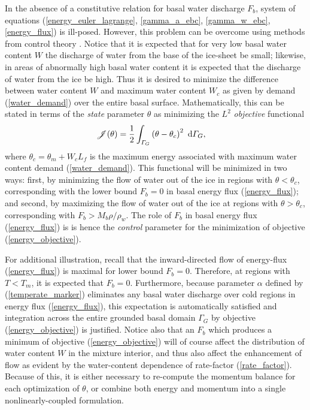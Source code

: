 In the absence of a constitutive relation for basal water discharge $F_b$, system of equations (\ref{energy_euler_lagrange}, \ref{gamma_a_ebc}, \ref{gamma_w_ebc}, \ref{energy_flux}) is ill-posed.  However, this problem can be overcome using methods from control theory \citep{bryson_1975, macayeal_1993, nocedal_2000}.  Notice that it is expected that for very low basal water content $W$ the discharge of water from the base of the ice-sheet be small; likewise, in areas of abnormally high basal water content it is expected that the discharge of water from the ice be high.  Thus it is desired to minimize the difference between water content $W$ and maximum water content $W_c$ as given by demand (\ref{water_demand}) over the entire basal surface.  Mathematically, this can be stated in terms of the  \emph{state} parameter $\theta$ as minimizing the  $L^2$ \emph{objective} functional
\begin{align}
  \label{energy_objective}
  \mathscr{J}(\theta) &= \frac{1}{2} \int_{\varGamma_G} \left( \theta - \theta_c \right)^2 \ \mathrm{d}\varGamma_G,
\end{align}
where $\theta_c = \theta_m + W_c L_f$ is the maximum energy associated with maximum water content demand (\ref{water_demand}).  This functional will be minimized in two ways: first, by minimizing the flow of water out of the ice in regions with $\theta < \theta_c$, corresponding with the lower bound $F_b = 0$ in basal energy flux (\ref{energy_flux}); and second, by maximizing the flow of water out of the ice at regions with $\theta > \theta_c$, corresponding with $F_b > M_b \rho / \rho_w$.  The role of $F_b$ in basal energy flux (\ref{energy_flux}) is is hence the  \emph{control} parameter for the minimization of objective (\ref{energy_objective}).

For additional illustration, recall that the inward-directed flow of energy-flux (\ref{energy_flux}) is maximal for lower bound $F_b = 0$.  Therefore, at regions with $T < T_m$, it is expected that $F_b = 0$.  Furthermore, because parameter $\alpha$ defined by (\ref{temperate_marker}) eliminates any basal water discharge over cold regions in energy flux (\ref{energy_flux}), this expectation is automatically satisfied and integration across the entire grounded basal domain $\Gamma_G$ by objective (\ref{energy_objective}) is justified.  Notice also that an $F_b$ which produces a minimum of objective (\ref{energy_objective}) will of course affect the distribution of water content $W$ in the mixture interior, and thus also affect the enhancement of flow as evident by the water-content dependence of rate-factor (\ref{rate_factor}).  Because of this, it is either necessary to re-compute the momentum balance for each optimization of $\theta$, or combine both energy and momentum into a single nonlinearly-coupled formulation.

